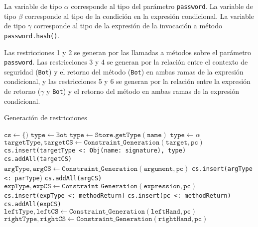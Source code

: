 La variable de tipo $\alpha$ corresponde al tipo del parámetro \texttt{password}. La variable de tipo $\beta$ corresponde al tipo de la condición en la expresión condicional. La variable de tipo $\gamma$ corresponde al tipo de la expresión de la invocación a método \texttt{password.hash()}.

Las restricciones 1 y 2 se generan por las llamadas a métodos sobre el parámetro \texttt{password}. Las restricciones 3 y 4 se generan por la relación entre el contexto de seguridad (\texttt{Bot}) y el retorno del método (\texttt{Bot}) en ambas ramas de la expresión condicional, y las restricciones 5 y 6 se generan por la relación entre la expresión de retorno ($\gamma$ y \texttt{Bot}) y el retorno del método en ambas ramas de la expresión condicional.
\clearpage
\begin{algorithm}\captionsetup{labelsep=newline}
  \centering
  \caption{Generación de restricciones}
  \label{pseudogen}
    \begin{algorithmic}[1]
          \State $\mathtt{cs\gets \{)}$
          \State $\mathtt{type\gets Bot}$
              \State $\mathtt{type\gets Store.getType(name)}$
            \EndCase
              \State $\mathtt{type\gets \alpha}$ \label{lineTVar}
              \State $\mathtt{targetType, targetCS\gets Constraint\_Generation(target, pc)}$ \label{lineAss}
              \State \texttt{cs.insert(targetType <: Obj(name: signature), type)}
              \State \texttt{cs.addAll(targetCS)}
                \State $\mathtt{argType, argCS\gets Constraint\_Generation(argument, pc)}$
                \State \texttt{cs.insert(argType <: parType})
                \State \texttt{cs.addAll(argCS)}
              \EndFor
            \EndCase
              \State $\mathtt{expType, expCS\gets Constraint\_Generation(expression, pc)}$
              \State \texttt{cs.insert(expType <: methodReturn)}
              \State \texttt{cs.insert(pc <: methodReturn)}
              \State \texttt{cs.addAll(expCS)}
            \EndCase
              \State $\mathtt{leftType, leftCS\gets Constraint\_Generation(leftHand, pc)}$
              \State $\mathtt{rightType, rightCS\gets Constraint\_Generation(rightHand, pc)}$

\end{algorithmic}
\end{algorithm}
